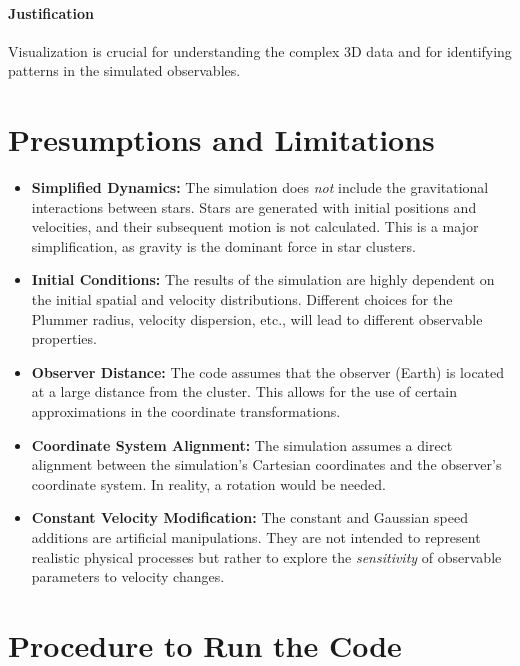 \documentclass{article}
\begin{document}
	\paragraph{Justification}
	
	Visualization is crucial for understanding the complex 3D data and for identifying patterns in the simulated observables.
	
	\section{Presumptions and Limitations}
	
	\begin{itemize}
		\item \textbf{Simplified Dynamics:} The simulation does \textit{not} include the gravitational interactions between stars. Stars are generated with initial positions and velocities, and their subsequent motion is not calculated. This is a major simplification, as gravity is the dominant force in star clusters.
		\item \textbf{Initial Conditions:} The results of the simulation are highly dependent on the initial spatial and velocity distributions. Different choices for the Plummer radius, velocity dispersion, etc., will lead to different observable properties. 
		\item \textbf{Observer Distance:} The code assumes that the observer (Earth) is located at a large distance from the cluster. This allows for the use of certain approximations in the coordinate transformations. 
		\item  \textbf{Coordinate System Alignment:} The simulation assumes a direct alignment between the simulation's Cartesian coordinates and the observer's coordinate system. In reality, a rotation would be needed.
		\item \textbf{Constant Velocity Modification:} The constant and Gaussian speed additions are artificial manipulations. They are not intended to represent realistic physical processes but rather to explore the \textit{sensitivity} of observable parameters to velocity changes.
	\end{itemize}
	
	\section{Procedure to Run the Code}
	
\end{document}
